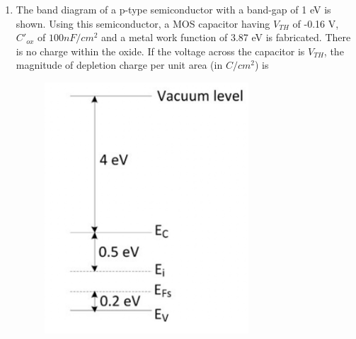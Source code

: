 \documentclass[a4paper, 11pt]{article}
\begin{document}
\begin{enumerate}
    \item The band diagram of a p-type semiconductor with a band-gap of 1 eV is shown. Using this semiconductor, a MOS capacitor having $V_{TH}$ of -0.16 V, $C'_{ox}$ of $100 nF/cm^2$ and a metal work function of 3.87 eV is fabricated. There is no charge within the oxide. If the voltage across the capacitor is $V_{TH}$, the magnitude of depletion charge per unit area (in $C/cm^2$) is
    \begin{figure}[H]
        \centering
        \includegraphics[width=0.4\columnwidth]{figs/Q32.png}
        \caption*{}
        \label{fig:q42}
    \end{figure}
    \begin{enumerate}
    \end{enumerate}
    
    \hfill{}


\end{enumerate}
\end{document}

